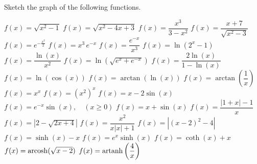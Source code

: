 \begin{Exercise} Sketch the graph of the following functions.
\begin{multicols}{2}
    \ifcalculus \Question[difficulty = 1] $f(x)=\sqrt{x^2-1}$ \fi
	\Question[difficulty = 1] $f(x)=\sqrt{x^2-4x+3}$ 
	\ifcalculus \Question[difficulty = 1] $f(x) = \dfrac{x^3}{3-x^2}$ \fi %
	\ifanalysis\Question[difficulty = 1]\fi\ifcalculus\Question[difficulty = 2]\fi $f(x)=\dfrac{x+7}{\sqrt{x^2-3}}$ 
	\Question[difficulty = 1] $f(x)=e^{-\frac{x^2}{2}}$
	\ifcalculus \Question[difficulty = 2] $f(x)=x^3\,e^{-x}$ \fi
	\ifanalysis\Question[difficulty = 1]\fi\ifcalculus\Question[difficulty = 2]\fi $f(x)=\dfrac{e^{-x}}{x^3}$  
	\Question[difficulty = 1] $f(x)=\ln (2^x-1)$
	\ifanalysis\Question[difficulty = 1]\fi\ifcalculus\Question[difficulty = 2]\fi $f(x)=\dfrac{\ln (x)}{x^2}$ 
	\Question[difficulty = 2] $f(x)=\ln\left(\sqrt{e^x+e^{-x}}\right)$
	\ifanalysis\Question[difficulty = 1]\fi\ifcalculus\Question[difficulty = 2]\fi $f(x)=\dfrac{2\ln (x)}{1- \ln (x)}$
	\Question[difficulty = 1] $f(x)=\ln\left( \cos (x)\right)$ 
	\Question[difficulty = 2] $f(x)=\arctan(\ln (x))$ 
	\Question[difficulty = 1] $f(x)=\arctan \left(\dfrac{1}{x}\right)$ 
	\Question[difficulty = 2] $f(x)=x^x$ 
	\Question[difficulty = 2] $f(x)=(x^2)^x$  
	\Question[difficulty = 1] $f(x) = x - 2\sin(x)$ 
	\Question[difficulty = 2] $f(x) = e^{-x} \sin(x), \quad (x \geq 0)$ 
	\Question[difficulty = 1] $f(x) = x + \sin(x)$ 
	\ifanalysis\Question[difficulty = 1]\fi\ifcalculus\Question[difficulty = 2]\fi $f(x)= \dfrac{|1+x|-1}{x}$ 
	\ifanalysis\Question[difficulty = 1]\fi\ifcalculus\Question[difficulty = 2]\fi $f(x) = \left|  2- \sqrt{2x+4} \right|$ 
	\ifanalysis\Question[difficulty = 1]\fi\ifcalculus\Question[difficulty = 2]\fi $f(x) = \dfrac{x^2}{x|x| + 1}$
	\ifanalysis\Question[difficulty = 1]\fi\ifcalculus\Question[difficulty = 2]\fi $f(x) = \left| (x-2)^2-4 \right| $
	\ifanalysis
	 \Question[difficulty = 1] $f(x)=\sinh (x)-x$
     \Question[difficulty = 1] $f(x)=e^x \sinh (x)$
     \Question[difficulty = 1] $f(x)=\coth (x) + x$
     \Question[difficulty = 2] $f(x)=\operatorname{arcosh} (\sqrt{x-2})$
     \Question[difficulty = 1] $f(x)=\operatorname{artanh} \left( \dfrac{4}{x} \right)$
	\fi
    \EndCurrentQuestion
\end{multicols}

\end{Exercise}

